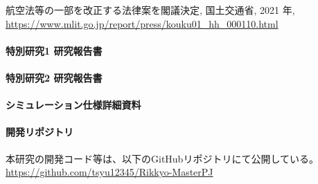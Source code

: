 \documentclass{article}[jsarticle]
\begin{document}
\begin{thebibliography}{9}
     航空法等の一部を改正する法律案を閣議決定, 国土交通省, 2021 年, \url{https://www.mlit.go.jp/report/press/kouku01_hh_000110.html}
\end{thebibliography}

\begin{appendix}
    \paragraph{特別研究1 研究報告書} \par
    \url{}

    \paragraph{特別研究2 研究報告書} \par
    \url{}

    \paragraph{シミュレーション仕様詳細資料} \par 
    \url{}

    \paragraph{開発リポジトリ} \par
    本研究の開発コード等は、以下のGitHubリポジトリにて公開している。
    \url{https://github.com/tsyu12345/Rikkyo-MasterPJ}

\end{appendix}
\end{document}
